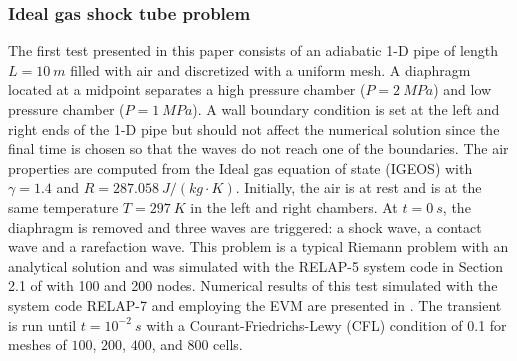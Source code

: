 \documentclass{inputs/mc2015}
\begin{document}
\subsubsection{Ideal gas shock tube problem} \label{sec:air-1-phase-shock-tube}
%
The first test presented in this paper consists of an adiabatic 1-D pipe of length $L=10 \ m$ filled with air and discretized with a uniform mesh.  A diaphragm located at a midpoint separates a high pressure chamber ($P=2 \ MPa$) and low pressure chamber ($P=1 \ MPa$). A wall boundary condition is set at the left and right ends of the 1-D pipe but should not affect the numerical solution since the final time is chosen so that the waves do not reach one of the boundaries. The air properties are computed from the Ideal gas equation of state (IGEOS) with $\gamma=1.4$ and $R=287.058\ J/(kg \cdot K)$. Initially, the air is at rest and is at the same temperature $T=297 \ K$ in the left and right chambers. At $t = 0 \ s$, the diaphragm is removed and three waves are triggered: a shock wave, a contact wave and a rarefaction wave. This problem is a typical Riemann problem with an analytical solution and was simulated with the RELAP-5 system code in Section 2.1 of \cite{Sokolowski-Koszela} with 100 and 200 nodes. Numerical results of this test simulated with the system code RELAP-7 and employing the EVM are presented in . The transient is run until $t=10^{-2} \ s$ with a Courant-Friedrichs-Lewy (CFL) condition of 0.1 for meshes of $100$, $200$, $400$, and $800$ cells. 
%
\end{document}
